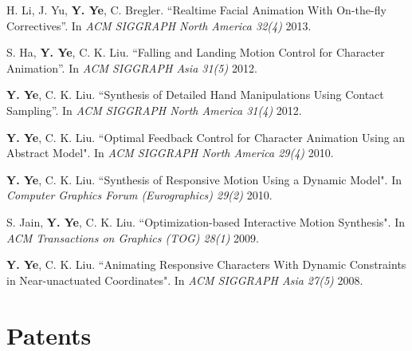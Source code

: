 \documentclass[margin,line]{res}
\begin{document}
\begin{resume}

\vspace*{-.1in}
H. Li, J. Yu, {\bf Y. Ye}, C. Bregler. ``Realtime Facial Animation With On-the-fly Correctives''. In {\em ACM SIGGRAPH North America 32(4)} 2013.


\vspace*{-.1in}
S. Ha, {\bf Y. Ye}, C. K. Liu. ``Falling and Landing Motion Control for Character Animation''. In {\em ACM SIGGRAPH Asia 31(5)} 2012.

\vspace*{-.1in}
{\bf Y. Ye}, C. K. Liu. ``Synthesis of Detailed Hand Manipulations Using Contact Sampling''. In {\em ACM SIGGRAPH North America 31(4)} 2012.

\vspace*{-.1in}
{\bf Y. Ye}, C. K. Liu. ``Optimal Feedback Control for Character Animation Using an Abstract Model". In {\em ACM SIGGRAPH North America 29(4)} 2010.

\vspace*{-.1in}
{\bf Y. Ye}, C. K. Liu. ``Synthesis of Responsive Motion Using a Dynamic Model". In {\em Computer Graphics Forum (Eurographics) 29(2)} 2010.

\vspace*{-.1in}
S. Jain, {\bf Y. Ye}, C. K. Liu. ``Optimization-based Interactive Motion Synthesis". In {\em ACM Transactions on Graphics (TOG) 28(1)} 2009. 

\vspace*{-.1in}
{\bf Y. Ye}, C. K. Liu. ``Animating Responsive Characters With Dynamic Constraints in Near-unactuated Coordinates".  In {\em ACM SIGGRAPH Asia 27(5)} 2008.



\section{\sc Patents}


\end{resume}
\end{document}
